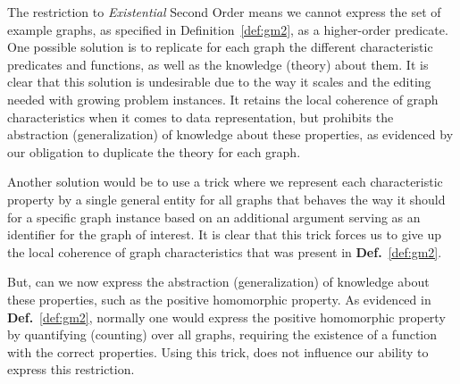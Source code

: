 \documentclass{article}
\theoremstyle{definition}
\begin{document}

The restriction to \emph{Existential} Second Order means we cannot express the set of example graphs, as specified in Definition~\ref{def:gm2}, as a higher-order predicate.
One possible solution is to replicate for each graph the different characteristic predicates and functions, as well as the knowledge (theory) about them.
It is clear that this solution is undesirable due to the way it scales and the editing needed with growing problem instances.
It retains the local coherence of graph characteristics when it comes to data representation, but prohibits the abstraction (generalization) of knowledge about these properties, as evidenced by our obligation to duplicate the theory for each graph.

Another solution would be to use a trick where we represent each characteristic property by a single general entity for all graphs that behaves the way it should for a specific graph instance based on an additional argument serving as an identifier for the graph of interest.
It is clear that this trick forces us to give up the local coherence of graph characteristics that was present in \textbf{Def.}~\ref{def:gm2}.


But, can we now express the abstraction (generalization) of knowledge about these properties, such as the positive homomorphic property.
As evidenced in \textbf{Def.}~\ref{def:gm2}, normally one would express the positive homomorphic property by quantifying (counting) over all graphs, requiring the existence of a function with the correct properties.
Using this trick, does not influence our ability to express this restriction.
\end{document}
